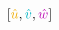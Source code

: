 \documentclass[preview]{standalone}
\begin{document}
$\left[\textcolor[HTML]{efac00}{\hat{u}}, \textcolor[HTML]{00b4c4}{\hat{v}}, \textcolor[HTML]{ba00b2}{\hat{w}}\right]$
\end{document}
